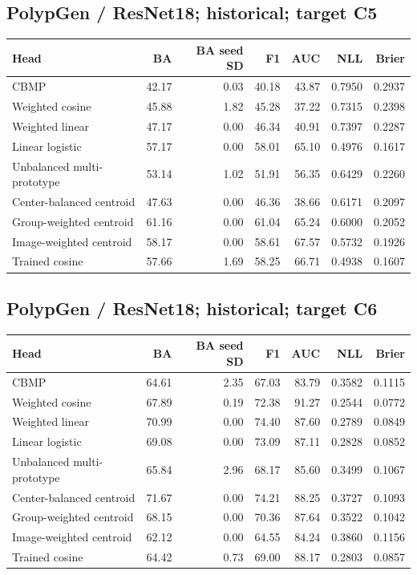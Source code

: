 \subsection*{PolypGen / ResNet18; historical; target C5}
\begingroup\small\setlength{\tabcolsep}{3pt}
\begin{longtable}{lrrrrrr}
\toprule Head & BA & BA seed SD & F1 & AUC & NLL & Brier \\
\midrule
CBMP & 42.17 & 0.03 & 40.18 & 43.87 & 0.7950 & 0.2937 \\
Weighted cosine & 45.88 & 1.82 & 45.28 & 37.22 & 0.7315 & 0.2398 \\
Weighted linear & 47.17 & 0.00 & 46.34 & 40.91 & 0.7397 & 0.2287 \\
Linear logistic & 57.17 & 0.00 & 58.01 & 65.10 & 0.4976 & 0.1617 \\
Unbalanced multi-prototype & 53.14 & 1.02 & 51.91 & 56.35 & 0.6429 & 0.2260 \\
Center-balanced centroid & 47.63 & 0.00 & 46.36 & 38.66 & 0.6171 & 0.2097 \\
Group-weighted centroid & 61.16 & 0.00 & 61.04 & 65.24 & 0.6000 & 0.2052 \\
Image-weighted centroid & 58.17 & 0.00 & 58.61 & 67.57 & 0.5732 & 0.1926 \\
Trained cosine & 57.66 & 1.69 & 58.25 & 66.71 & 0.4938 & 0.1607 \\
\bottomrule
\end{longtable}
\endgroup
\subsection*{PolypGen / ResNet18; historical; target C6}
\begingroup\small\setlength{\tabcolsep}{3pt}
\begin{longtable}{lrrrrrr}
\toprule Head & BA & BA seed SD & F1 & AUC & NLL & Brier \\
\midrule
CBMP & 64.61 & 2.35 & 67.03 & 83.79 & 0.3582 & 0.1115 \\
Weighted cosine & 67.89 & 0.19 & 72.38 & 91.27 & 0.2544 & 0.0772 \\
Weighted linear & 70.99 & 0.00 & 74.40 & 87.60 & 0.2789 & 0.0849 \\
Linear logistic & 69.08 & 0.00 & 73.09 & 87.11 & 0.2828 & 0.0852 \\
Unbalanced multi-prototype & 65.84 & 2.96 & 68.17 & 85.60 & 0.3499 & 0.1067 \\
Center-balanced centroid & 71.67 & 0.00 & 74.21 & 88.25 & 0.3727 & 0.1093 \\
Group-weighted centroid & 68.15 & 0.00 & 70.36 & 87.64 & 0.3522 & 0.1042 \\
Image-weighted centroid & 62.12 & 0.00 & 64.55 & 84.24 & 0.3860 & 0.1156 \\
Trained cosine & 64.42 & 0.73 & 69.00 & 88.17 & 0.2803 & 0.0857 \\
\bottomrule
\end{longtable}
\endgroup
